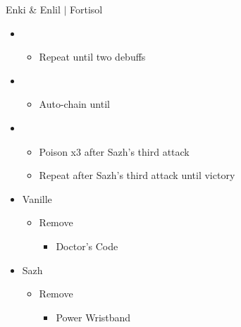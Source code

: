 \begin{battle}{Enki \& Enlil $|$ Fortisol}
\begin{multicols}{2}
\begin{itemize}
\begin{itemize}
    \end{itemize}
    \item \fifth
    \begin{itemize}
        \item Repeat until two debuffs
    \end{itemize}
    \item \fourth
    \begin{itemize}
        \item Auto-chain until \stagger
    \end{itemize}
    \item \sixth
    \begin{itemize}
        \item Poison x3 after Sazh's third attack
        \item Repeat after Sazh's third attack until victory
    \end{itemize}
\end{itemize}
\vfill\null
\end{multicols}
\end{battle}
\begin{menu}
\begin{itemize}
    \equip
    \begin{itemize}
        \item Vanille
        \begin{itemize}
            \item Remove
            \begin{itemize}
                \item Doctor's Code
            \end{itemize}
        \end{itemize}
        \item Sazh
        \begin{itemize}
            \item Remove
            \begin{itemize}
                \item Power Wristband
            \end{itemize}
        \end{itemize}
    \end{itemize}
\end{itemize}
\end{menu}